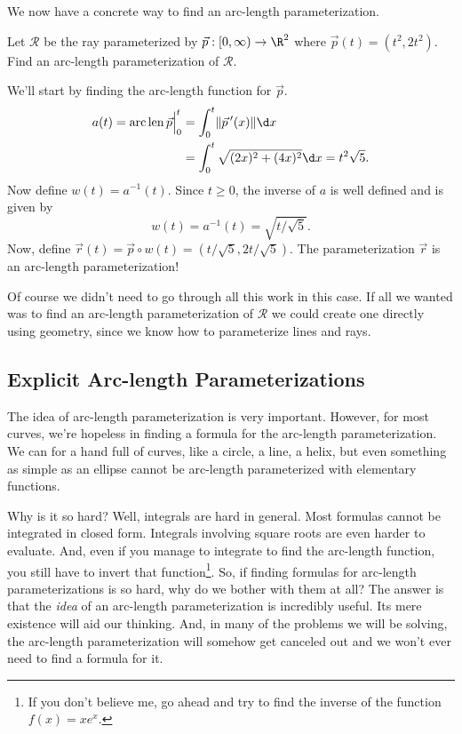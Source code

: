 We now have a concrete way to find an arc-length parameterization.
\begin{example}
	Let $\mathcal R$ be the ray parameterized by 
	$\vec p:[0,\infty)\to\R^2$ where $\vec p(t) = (t^2,2t^2)$.  Find an arc-length
	parameterization of $\mathcal R$.

	We'll start by finding the arc-length function for $\vec p$.
	\begin{align*}
		a(t)=\Arclenfrom{\vec p}{0}{t} &= \int_0^t \norm{\vec p\,'(x)}\d x\\
		&=\int_0^t \sqrt{(2x)^2+(4x)^2}\d x = t^2\sqrt{5}.
	\end{align*}
	Now define $w(t)=a^{-1}(t)$.  Since $t\geq 0$, the inverse of $a$ is well defined
	and is given by
	\[
		w(t)=a^{-1}(t) = \sqrt{t/\sqrt{5}}.
	\]
	Now, define $\vec r(t) = \vec p\circ w(t)=(t/\sqrt{5},2t/\sqrt{5})$.  The parameterization
	$\vec r$ is an arc-length parameterization!

	Of course we didn't need to go through all this work in this case.  If all we wanted was
	to find an arc-length parameterization of $\mathcal R$ we could create one directly using
	geometry, since we know how to parameterize lines and rays.
\end{example}

\subsection{Explicit Arc-length Parameterizations}
The idea of arc-length parameterization is very important.  However, for most curves,
we're hopeless in finding a formula for the arc-length parameterization.  We can for a hand
full of curves, like a circle, a line, a helix, but even something as simple as an ellipse
cannot be arc-length parameterized with elementary functions.

Why is it so hard?  Well, integrals are hard in general.  Most formulas cannot be integrated in closed
form.  Integrals involving square roots are even harder to evaluate.  And, even if you manage
to integrate to find the arc-length function, you still have to invert that function\footnote{ If you don't
believe me, go ahead and 
try to find the inverse of the function $f(x)=xe^x$. }.  So, if finding formulas for arc-length parameterizations
is so hard, why do we bother with them at all?  The answer is that the \emph{idea} of an arc-length parameterization
is incredibly useful. Its mere existence will aid our thinking.  And, in many of the problems we will be solving,
the arc-length parameterization will somehow get canceled out and we won't ever need to find a formula for it.

